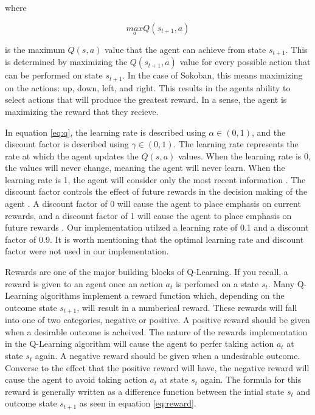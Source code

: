 \documentclass[times, 10pt,twocolumn]{article}
\begin{document}
where 

\begin{equation}
\underset{a}{max}Q(s_{t+1}, a)
\end{equation}

is the maximum $Q(s, a)$ value that the agent can achieve from state $s_{t+1}$. This is determined by maximizing the $Q(s_{t+1}, a)$ value for every possible action that can be performed on state $s_{t+1}$. In the case of Sokoban, this means maximizing on the actions: up, down, left, and right. This results in the agents ability to select actions that will produce the greatest reward. In a sense, the agent is maximizing the reward that they recieve. 

In equation \ref{eq:q}, the learning rate is described using $\alpha \in (0, 1)$, and the discount factor is described using $\gamma \in (0, 1)$. The learning rate represents the rate at which the agent updates the $Q(s, a)$ values. When the learning rate is 0, the values will never change, meaning the agent will never learn. When the learning rate is 1, the agent will consider only the most recent information \cite{Littman94markovgames}. The discount factor controls the effect of future rewards in the decision making of the agent \cite{Littman94markovgames}. A discount factor of 0 will cause the agent to place emphasis on current rewards, and a discount factor of 1 will cause the agent to place emphasis on future rewards \cite{Littman94markovgames}. Our implementation utilzed a learning rate of 0.1 and a discount factor of 0.9. It is worth mentioning that the optimal learning rate and discount factor were not used in our implementation.


Rewards are one of the major building blocks of Q-Learning.  If you recall, a reward is given to an agent once an action $a_t$ is perfomed on a state $s_t$.  Many Q-Learning algorithms implement a reward function which, depending on the outcome state $s_{t+1}$, will result in a numberical reward.  These rewards will fall into one of two categories, negative or positive.  A positive reward should be given when a desirable outcome is acheived. The nature of the rewards implementation in the Q-Learning algorithm will cause the agent to perfer taking action $a_t$ at state $s_t$ again.  A negative reward should be given when a undesirable outcome.  Converse to the effect that the positive reward will have, the negative reward will cause the agent to avoid taking action $a_t$ at state $s_t$ again.  The formula for this reward is generally written as a difference function between the intial state $s_t$ and outcome state $s_{t+1}$ as seen in equation \ref{eq:reward}.
\end{document}
